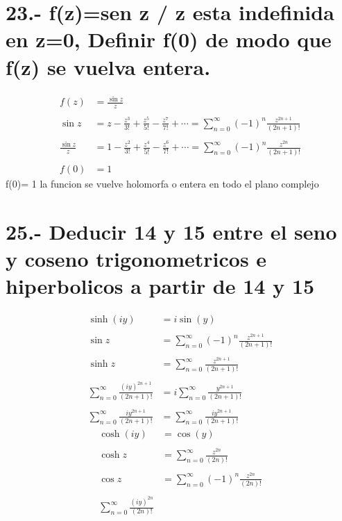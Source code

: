 \documentclass{article}
\begin{document}
\section*{23.- f(z)=sen z / z esta indefinida en z=0, Definir f(0) de modo que f(z) se vuelva entera.}
\begin{align*}
f(z) &= \frac{\sin z}{z} \\
\\
\sin z &= z - \frac{z^3}{3!} + \frac{z^5}{5!} - \frac{z^7}{7!} + \dotsb = \sum_{n=0}^{\infty} (-1)^n \frac{z^{2n+1}}{(2n+1)!} \\
\\
\frac{\sin z}{z} &= 1 - \frac{z^2}{3!} + \frac{z^4}{5!} - \frac{z^6}{7!} + \dotsb = \sum_{n=0}^{\infty} (-1)^n \frac{z^{2n}}{(2n+1)!} \\
\\
f(0) &= 1
\end{align*}
f(0)= 1 la funcion se vuelve holomorfa o entera en todo el plano complejo
\section*{25.- Deducir 14 y 15 entre el seno y coseno trigonometricos e hiperbolicos a partir de 14 y 15}
\begin{align*}
\sinh(iy) &= i \sin(y) \\ \\
\sin z &= \sum_{n=0}^{\infty} (-1)^n \frac{z^{2n+1}}{(2n+1)!} \\
\\
\sinh z &= \sum_{n=0}^{\infty} \frac{z^{2n+1}}{(2n+1)!} \\
\\
\sum_{n=0}^{\infty} \frac{(iy)^{2n+1}}{(2n+1)!} &= i \sum_{n=0}^{\infty} \frac{y^{2n+1}}{(2n+1)!} \\
\\
\sum_{n=0}^{\infty} \frac{i y^{2n+1}}{(2n+1)!} &= \sum_{n=0}^{\infty} \frac{i y^{2n+1}}{(2n+1)!}
\end{align*}
\begin{align*}
\cosh(iy) &= \cos(y) \\ \\
\cosh z &= \sum_{n=0}^{\infty} \frac{z^{2n}}{(2n)!} \\
\\
\cos z &= \sum_{n=0}^{\infty} (-1)^n \frac{z^{2n}}{(2n)!} \\
\\
\sum_{n=0}^{\infty} \frac{(iy)^{2n}}{(2n)!} 
\end{align*}
\end{document}
